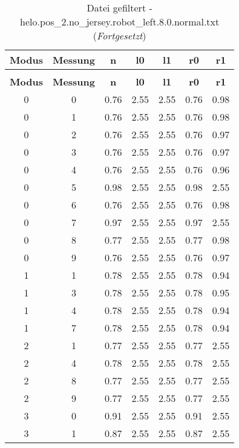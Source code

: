 \clearpage{}
\begin{longtable}{|c|c||c||c|c||c|c|}
	\caption{Datei gefiltert - helo.pos\_2.no\_jersey.robot\_left.8.0.normal.txt} \label{tab:helo.pos-2.no-jersey.robot-left.8.0.normal.txt} \\ \hline
	\textbf{Modus} & \textbf{Messung} & \textbf{n} & \textbf{l0} & \textbf{l1} & \textbf{r0} & \textbf{r1}\\ \hline
	\endfirsthead
	\caption[]{Datei gefiltert - helo.pos\_2.no\_jersey.robot\_left.8.0.normal.txt (\emph{Fortgesetzt})} \\ \hline
	\textbf{Modus} & \textbf{Messung} & \textbf{n} & \textbf{l0} & \textbf{l1} & \textbf{r0} & \textbf{r1}\\ \hline
	\endhead
	0 & 0 & 0.76 & 2.55 & 2.55 & 0.76 & 0.98 \\ \hline
	0 & 1 & 0.76 & 2.55 & 2.55 & 0.76 & 0.98 \\ \hline
	0 & 2 & 0.76 & 2.55 & 2.55 & 0.76 & 0.97 \\ \hline
	0 & 3 & 0.76 & 2.55 & 2.55 & 0.76 & 0.97 \\ \hline
	0 & 4 & 0.76 & 2.55 & 2.55 & 0.76 & 0.96 \\ \hline
	0 & 5 & 0.98 & 2.55 & 2.55 & 0.98 & 2.55 \\ \hline
	0 & 6 & 0.76 & 2.55 & 2.55 & 0.76 & 0.98 \\ \hline
	0 & 7 & 0.97 & 2.55 & 2.55 & 0.97 & 2.55 \\ \hline
	0 & 8 & 0.77 & 2.55 & 2.55 & 0.77 & 0.98 \\ \hline
	0 & 9 & 0.76 & 2.55 & 2.55 & 0.76 & 0.97 \\ \hline
	1 & 1 & 0.78 & 2.55 & 2.55 & 0.78 & 0.94 \\ \hline
	1 & 3 & 0.78 & 2.55 & 2.55 & 0.78 & 0.95 \\ \hline
	1 & 4 & 0.78 & 2.55 & 2.55 & 0.78 & 0.94 \\ \hline
	1 & 7 & 0.78 & 2.55 & 2.55 & 0.78 & 0.94 \\ \hline
	2 & 1 & 0.77 & 2.55 & 2.55 & 0.77 & 2.55 \\ \hline
	2 & 4 & 0.78 & 2.55 & 2.55 & 0.78 & 2.55 \\ \hline
	2 & 8 & 0.77 & 2.55 & 2.55 & 0.77 & 2.55 \\ \hline
	2 & 9 & 0.77 & 2.55 & 2.55 & 0.77 & 2.55 \\ \hline
	3 & 0 & 0.91 & 2.55 & 2.55 & 0.91 & 2.55 \\ \hline
	3 & 1 & 0.87 & 2.55 & 2.55 & 0.87 & 2.55 \\ \hline

\end{longtable}
